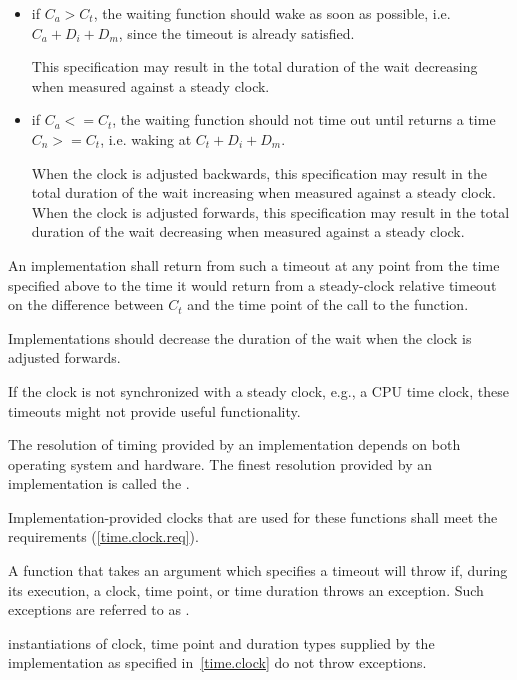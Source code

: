 \begin{itemize}
\item
if $C_a > C_t$, the waiting function should wake as soon as possible, i.e. $C_a + D_i + D_m$,
since the timeout is already satisfied. \begin{note} This specification may result in the total
duration of the wait decreasing when measured against a steady clock. \end{note}

\item
if $C_a <= C_t$, the waiting function should not time out until  returns a
time $C_n >= C_t$, i.e. waking at $C_t + D_i + D_m$. \begin{note} When the clock is adjusted
backwards, this specification may result in the total duration of the wait increasing when
measured against a steady clock. When the clock is adjusted forwards, this specification may
result in the total duration of the wait decreasing when measured against a steady clock.
\end{note}
\end{itemize}

An implementation shall return from such a timeout at any point from the time specified above to
the time it would return from a steady-clock relative timeout on the difference between $C_t$
and the time point of the call to the  function. \begin{note} Implementations
should decrease the duration of the wait when the clock is adjusted forwards.
\end{note}

\pnum
\begin{note} If the clock is not synchronized with a steady clock, e.g., a CPU time clock, these
timeouts might not provide useful functionality. \end{note}

\pnum
The resolution of timing provided by an implementation depends on both operating system
and hardware. The finest resolution provided by an implementation is called the
.

\pnum
Implementation-provided clocks that are used for these functions shall meet the
 requirements (\ref{time.clock.req}).

\pnum
A function that takes an argument which specifies a timeout will throw if,
during its execution, a clock, time point, or time duration throws an exception.
Such exceptions are referred to as .
\begin{note} instantiations of clock, time point and duration types supplied by
the implementation as specified in~\ref{time.clock} do not throw exceptions.
\end{note}

